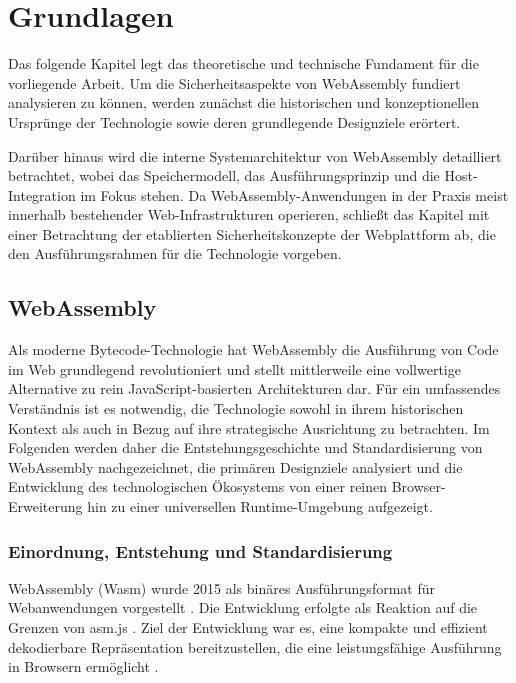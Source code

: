 \clearpage

\section{Grundlagen}

Das folgende Kapitel legt das theoretische und technische Fundament für die vorliegende Arbeit. Um die Sicherheitsaspekte von WebAssembly fundiert analysieren zu können, werden zunächst die historischen und konzeptionellen Ursprünge der Technologie sowie deren grundlegende Designziele erörtert.

Darüber hinaus wird die interne Systemarchitektur von WebAssembly detailliert betrachtet, wobei das Speichermodell, das Ausführungsprinzip und die Host-Integration im Fokus stehen. Da WebAssembly-Anwendungen in der Praxis meist innerhalb bestehender Web-Infrastrukturen operieren, schließt das Kapitel mit einer Betrachtung der etablierten Sicherheitskonzepte der Webplattform ab, die den Ausführungsrahmen für die Technologie vorgeben.

\subsection{WebAssembly}

Als moderne Bytecode-Technologie hat WebAssembly die Ausführung von Code im Web grundlegend revolutioniert und stellt mittlerweile eine vollwertige Alternative zu rein JavaScript-basierten Architekturen dar. Für ein umfassendes Verständnis ist es notwendig, die Technologie sowohl in ihrem historischen Kontext als auch in Bezug auf ihre strategische Ausrichtung zu betrachten. Im Folgenden werden daher die Entstehungsgeschichte und Standardisierung von WebAssembly nachgezeichnet, die primären Designziele analysiert und die Entwicklung des technologischen Ökosystems von einer reinen Browser-Erweiterung hin zu einer universellen Runtime-Umgebung aufgezeigt.

\subsubsection{Einordnung, Entstehung und Standardisierung}

WebAssembly (Wasm) wurde 2015 als binäres Ausführungsformat für Webanwendungen vorgestellt \cite{eich2015webassembly}. Die Entwicklung erfolgte als Reaktion auf die Grenzen von asm.js \cite{mozilla2013asmjs}. Ziel der Entwicklung war es, eine kompakte und effizient dekodierbare Repräsentation bereitzustellen, die eine leistungsfähige Ausführung in Browsern ermöglicht \cite{webassembly_faq}.

